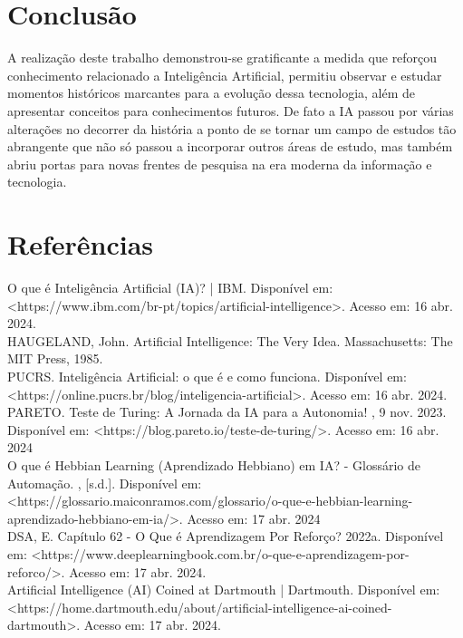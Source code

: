 \documentclass[a4paper,12pt]{article}
\begin{document}
\section{Conclusão}

A realização deste trabalho demonstrou-se gratificante a medida que reforçou conhecimento relacionado a Inteligência Artificial, permitiu observar e estudar momentos históricos marcantes para a evolução dessa tecnologia, além de apresentar conceitos para conhecimentos futuros. De fato a IA passou por várias alterações no decorrer da história a ponto de se tornar um campo de estudos tão abrangente que não só passou a incorporar outros áreas de estudo, mas também abriu portas para novas frentes de pesquisa na era moderna da informação e tecnologia.

\section{Referências}
\noindent O que é Inteligência Artificial (IA)? | IBM. Disponível em: <https://www.ibm.com/br-pt/topics/artificial-intelligence>. Acesso em: 16 abr. 2024.  \\

\noindent HAUGELAND, John. Artificial Intelligence: The Very Idea. Massachusetts: The MIT Press, 1985.\\ 

\noindent PUCRS. Inteligência Artificial: o que é e como funciona. Disponível em: <https://online.pucrs.br/blog/inteligencia-artificial>. Acesso em: 16 abr. 2024. \\

\noindent PARETO. Teste de Turing: A Jornada da IA para a Autonomia! , 9 nov. 2023. Disponível em: <https://blog.pareto.io/teste-de-turing/>. Acesso em: 16 abr. 2024\\

\noindent O que é Hebbian Learning (Aprendizado Hebbiano) em IA? - Glossário de Automação. , [s.d.]. Disponível em: <https://glossario.maiconramos.com/glossario/o-que-e-hebbian-learning-aprendizado-hebbiano-em-ia/>. Acesso em: 17 abr. 2024 \\

\noindent DSA, E. Capítulo 62 - O Que é Aprendizagem Por Reforço? 2022a. Disponível em: <https://www.deeplearningbook.com.br/o-que-e-aprendizagem-por-reforco/>. Acesso em: 17 abr. 2024. \\

\noindent Artificial Intelligence (AI) Coined at Dartmouth | Dartmouth. Disponível em: <https://home.dartmouth.edu/about/artificial-intelligence-ai-coined-dartmouth>. Acesso em: 17 abr. 2024. \\
\end{document}
